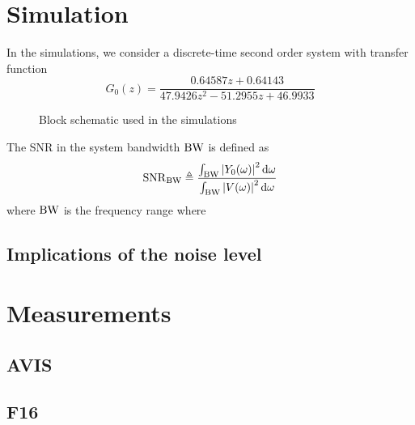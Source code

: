 \section{Simulation}
\label{sec:simulations}

In the simulations, we consider a discrete-time second order system with transfer function
\begin{equation}
G_0(z) = \frac{0.64587 z + 0.64143}
                             {47.9426 z^2 - 51.2955 z + 46.9933}
\end{equation}


\begin{figure}
 \centering
  
  \caption{Block schematic used in the simulations}
\end{figure}


The \gls{SNR} in the system bandwidth $\mathrm{BW}$ is defined as
\begin{equation}
  \mathrm{SNR}_{\mathrm{BW}} \triangleq
  \frac{\int_{\mathrm{BW}} \left| Y_0(\omega) \right|^2 \mathrm{d}{\omega}}
            {\int_{\mathrm{BW}} \left| V(\omega) \right|^2 \mathrm{d}{\omega}}
\end{equation}
where $\mathrm{BW}$ is the frequency range where



  \subsection{Implications of the noise level}


  \section{Measurements}
  \label{sec:measurements}
   \subsection{AVIS}
   \subsection{F16}

